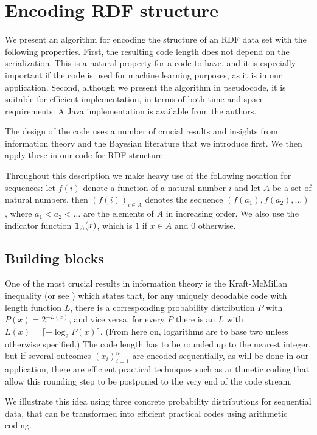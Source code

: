 \appendix

\section{Encoding RDF structure}
We present an algorithm for encoding the structure of an RDF data set
with the following properties. First, the resulting code length does
not depend on the serialization. This is a natural property for a code
to have, and it is especially important if the code is used for
machine learning purposes, as it is in our application. Second,
although we present the algorithm in pseudocode, it is suitable for
efficient implementation, in terms of both time and space
requirements. A Java implementation is available from the authors.

The design of the code uses a number of crucial results and insights
from information theory and the Bayesian literature that we introduce
first. We then apply these in our code for RDF structure.

Throughout this description we make heavy use of the following
notation for sequences: let $f(i)$ denote a function of a natural
number $i$ and let $A$ be a set of natural numbers, then $(f(i))_{i\in
  A}$ denotes the sequence $(f(a_1), f(a_2), \ldots)$, where
$a_1<a_2<\ldots$ are the elements of $A$ in increasing order.
We also use the indicator function $\mathop{\mathbf{1}}_A(x)$, which is $1$ if $x\in
A$ and $0$ otherwise.

\subsection{Building blocks}
One of the most crucial results in information theory is the
Kraft-McMillan inequality \cite{KraftMcMillan1956} (or see
\cite[page 82]{cover1991}) which states that,
for any uniquely decodable code with length function $L$, there is a
corresponding probability distribution $P$ with $P(x)=2^{-L(x)}$, and
vice versa, for every $P$ there is an $L$ with $L(x)=\lceil-\log_2
P(x)\rceil$. (From here on, logarithms are to base two unless
otherwise specified.) The code length has to be rounded up to the
nearest integer, but if several outcomes $(x_i)_{i=1}^n$ are encoded
sequentially, as will be done in our application, there are efficient
practical techniques such as arithmetic coding \cite{Rissanen1976} that allow
this rounding step to be postponed to the very end of the code stream.

We illustrate this idea using three concrete probability distributions
for sequential data, that can be transformed into efficient practical
codes using arithmetic coding.

